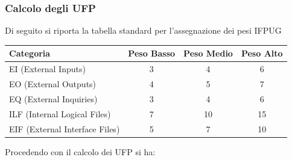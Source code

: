 \documentclass[12pt, a4paper]{article}
\begin{document}
\subsubsection{Calcolo degli UFP}
Di seguito si riporta la tabella standard per l’assegnazione dei pesi IFPUG\begin{center}

\begin{longtable}{|l|c|c|c|}
\hline
\textbf{Categoria} & \textbf{Peso Basso} & \textbf{Peso Medio} & \textbf{Peso Alto} \\
\hline
\endfirsthead

EI (External Inputs)           & 3  & 4  & 6  \\
\hline
EO (External Outputs)          & 4  & 5  & 7  \\
\hline
EQ (External Inquiries)        & 3  & 4  & 6  \\
\hline
ILF (Internal Logical Files)   & 7  & 10 & 15 \\
\hline
EIF (External Interface Files) & 5  & 7  & 10 \\
\hline
\end{longtable}

\end{center}
Procedendo con il calcolo dei UFP si ha:
\end{document}
